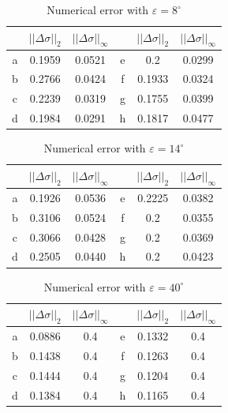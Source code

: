 \documentclass{procDDs}
\begin{document}
\begin{table}[h!]
	\begin{tabular}{|c|c|c||c|c|c|}
		\hline
		& $||\Delta\sigma||_2$ & $||\Delta\sigma||_\infty$ &
		& $||\Delta\sigma||_2$ & $||\Delta\sigma||_\infty$ \\ \hline
		a & 0.1959 & 0.0521 & e &  0.2 & 0.0299\\ \hline
		b & 0.2766 & 0.0424 & f &  0.1933 & 0.0324\\ \hline
		c & 0.2239 & 0.0319 & g &  0.1755 & 0.0399\\ \hline
		d & 0.1984 & 0.0291 & h &  0.1817 & 0.0477\\ \hline
	\end{tabular}
	\label{table:desc4}
	\caption{Numerical error with $\varepsilon=8^\circ$}
\end{table}
\begin{table}[h!]
	\begin{tabular}{|c|c|c||c|c|c|}
		\hline
		& $||\Delta\sigma||_2$ & $||\Delta\sigma||_\infty$ &
		& $||\Delta\sigma||_2$ & $||\Delta\sigma||_\infty$ \\ \hline
		a & 0.1926 & 0.0536 & e &  0.2225 & 0.0382\\ \hline
		b & 0.3106 & 0.0524 & f &  0.2 & 0.0355\\ \hline
		c & 0.3066 & 0.0428 & g &  0.2 & 0.0369\\ \hline
		d & 0.2505 & 0.0440 & h &  0.2 & 0.0423\\ \hline
	\end{tabular}
	\label{table:desc5}
	\caption{Numerical error with $\varepsilon=14^\circ$}
\end{table}
\begin{table}[h!]
	\begin{tabular}{|c|c|c||c|c|c|}
		\hline
		& $||\Delta\sigma||_2$ & $||\Delta\sigma||_\infty$ &
		& $||\Delta\sigma||_2$ & $||\Delta\sigma||_\infty$ \\ \hline
		a & 0.0886 & 0.4 & e &  0.1332 & 0.4\\ \hline
		b & 0.1438 & 0.4 & f &  0.1263 & 0.4\\ \hline
		c & 0.1444 & 0.4 & g &  0.1204 & 0.4\\ \hline
		d & 0.1384 & 0.4 & h &  0.1165 & 0.4\\ \hline
	\end{tabular}
	\label{table:desc6}
	\caption{Numerical error with $\varepsilon=40^\circ$}
\end{table}
\end{document}
